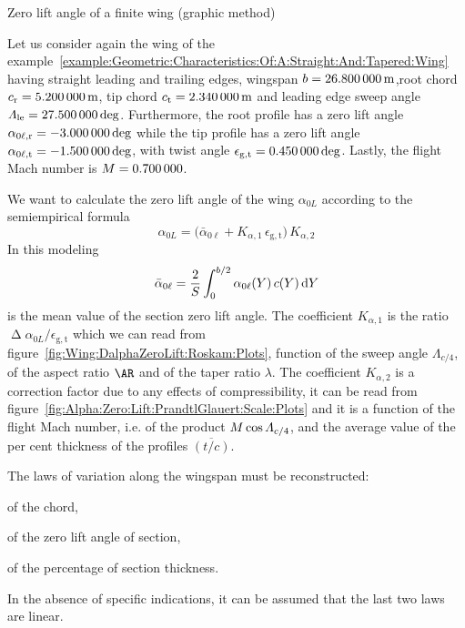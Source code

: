 \documentclass[[12pt,twoside]{book}
\begin{document}
%
\begin{myExampleX}{Zero lift angle of a finite wing (graphic method)}{\ \myIconGraph\ }%
\label{example:Zero:Lift:Angle:Graphic:Method}
%

%
\noindent
Let us consider again the wing of the example~\ref{example:Geometric:Characteristics:Of:A:Straight:And:Tapered:Wing} having straight leading and trailing edges, wingspan $b=\SI[round-precision=1]{\mySpanWingMT}{\metre}$,root chord $c_\mathrm{r}=\SI[round-precision=2]{\myChordRootWingMT}{\metre}$,
tip chord $c_\mathrm{t}=\SI[round-precision=2]{\myChordTipWingMT}{\metre}$
and leading edge sweep angle $\Lambda_\mathrm{le}=\SI[round-precision=1]{\mySweepLEWingDEG}{\deg}$.
Furthermore, the root profile has a zero lift angle
$\alpha_{0\ell,\mathrm{r}}=\SI[round-precision=1]{\myAlphaZeroLiftRootWingDEG}{\deg}$
while the tip profile has a zero lift angle
$\alpha_{0\ell,\mathrm{t}}=\SI[round-precision=1]{\myAlphaZeroLiftTipWingDEG}{\deg}$,
with twist angle
$\epsilon_{\mathrm{g,t}}=\SI[round-precision=1]{\myTwistWingDEG}{\deg}$.
Lastly, the flight Mach number is $\Mach=\SI[round-precision=2]{\myMach}{}$.

We want to calculate the zero lift angle of the wing $\alpha_{0L}$ 
according to the semiempirical formula
\begin{equation}
\label{eq:Wing:Alpha:Zero:Lift:Roskam:Datcom}
\alpha_{0L} =
  \Big(
    \bar{\alpha}_{0\ell} + K_{\alpha,1} \, \epsilon_{\mathrm{g,t}}
  \Big) 
  \, K_{\alpha,2}
\end{equation}
In this modeling
\[
\bar{\alpha}_{0\ell} = \frac{2}{S} \int_0^{b/2} \alpha_{0\ell}(Y)\, c(Y) \diff{Y}
\]
is the mean value of the section zero lift angle.
The coefficient
$K_{\alpha,1}$ is the ratio
$\upDelta\alpha_{0L}/\epsilon_{\mathrm{g,t}}$ which we can read from
figure~\ref{fig:Wing:DalphaZeroLift:Roskam:Plots},
function of the sweep angle $\Lambda_{c/4}$, of the aspect ratio $\AR$
and of the taper ratio $\lambda$.
The coefficient
$K_{\alpha,2}$ is a correction factor due to any
effects of compressibility, it can be read from figure~\ref{fig:Alpha:Zero:Lift:PrandtlGlauert:Scale:Plots}
and it is a function of the flight Mach number, i.e. of the product $\Mach\cos\Lambda_{c/4}$,
and the average value of the per cent thickness of the profiles $\overline{(t/c)}$.

\medskip

The laws of variation along the wingspan must be reconstructed:%
\begin{inparaenum}
\item
of the chord,
\item
of the zero lift angle of section,
\item
of the percentage of section thickness.
\end{inparaenum}
In the absence of specific indications, it can be assumed
that the last two laws are linear.


\end{myExampleX}
\end{document}
